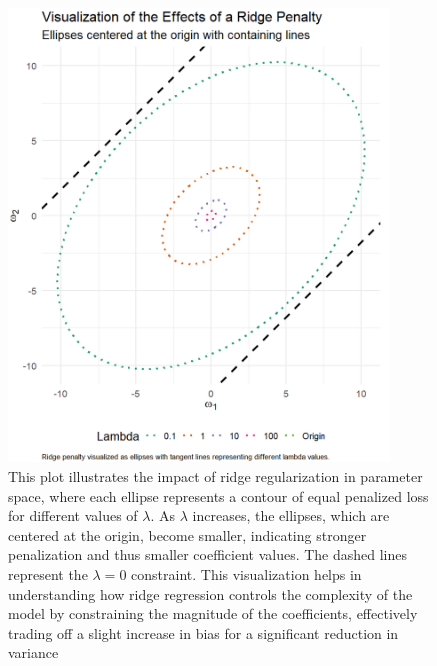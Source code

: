 \begin{figure}[H]
    \centering
    \includegraphics[width=0.9\textwidth]{visuals/ridge_effect_plot_bigger_dots.png}
    \caption{This plot illustrates the impact of ridge regularization in parameter space, where each ellipse represents a contour of equal penalized loss for different values of $\lambda$. As $\lambda$ increases, the ellipses, which are centered at the origin, become smaller, indicating stronger penalization and thus smaller coefficient values. The dashed lines represent the $ \lambda = 0 $ constraint. This visualization helps in understanding how ridge regression controls the complexity of the model by constraining the magnitude of the coefficients, effectively trading off a slight increase in bias for a significant reduction in variance \cite{Statlect2023Ridge}}
    \label{fig:tps}
\end{figure}
